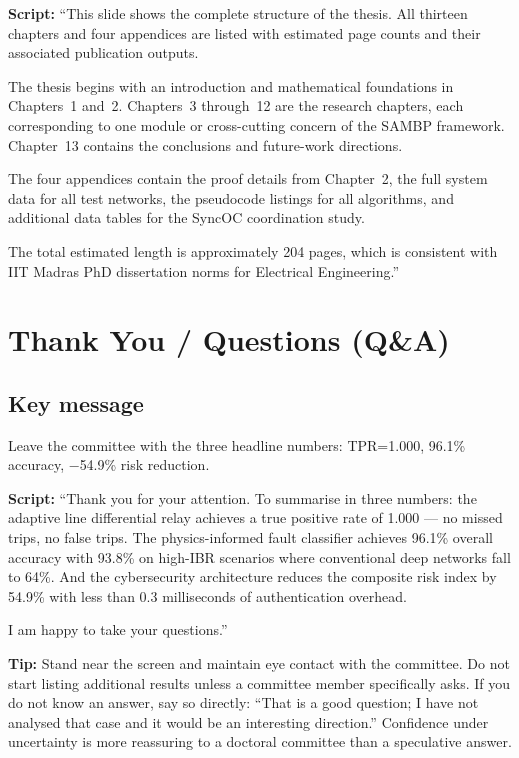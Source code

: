 \documentclass[11pt,a4paper]{article}
\newcommand{\script}[1]{\begin{scriptbox}\textbf{Script:} #1\end{scriptbox}}
\newcommand{\tip}[1]{\begin{tipbox}\textbf{Tip:} #1\end{tipbox}}
\begin{document}
\script{%
``This slide shows the complete structure of the thesis. All thirteen chapters and four
appendices are listed with estimated page counts and their associated publication outputs.

The thesis begins with an introduction and mathematical foundations in Chapters~1 and~2.
Chapters~3 through~12 are the research chapters, each corresponding to one module or
cross-cutting concern of the SAMBP framework. Chapter~13 contains the conclusions and
future-work directions.

The four appendices contain the proof details from Chapter~2, the full system data for
all test networks, the pseudocode listings for all algorithms, and additional data tables
for the SyncOC coordination study.

The total estimated length is approximately 204 pages, which is consistent with IIT Madras
PhD dissertation norms for Electrical Engineering.''%
}

\section{Thank You / Questions \hfill\normalfont\small(Q\&A)}
\label{slide:thanks}

\subsection*{Key message}
Leave the committee with the three headline numbers: TPR=1.000, 96.1\% accuracy,
$-$54.9\% risk reduction.

\script{%
``Thank you for your attention. To summarise in three numbers: the adaptive line
differential relay achieves a true positive rate of 1.000 --- no missed trips, no false
trips. The physics-informed fault classifier achieves 96.1\% overall accuracy with 93.8\%
on high-IBR scenarios where conventional deep networks fall to 64\%. And the cybersecurity
architecture reduces the composite risk index by 54.9\% with less than 0.3 milliseconds
of authentication overhead.

I am happy to take your questions.''%
}

\tip{Stand near the screen and maintain eye contact with the committee. Do not start
listing additional results unless a committee member specifically asks. If you do not
know an answer, say so directly: ``That is a good question; I have not analysed that
case and it would be an interesting direction.'' Confidence under uncertainty is more
reassuring to a doctoral committee than a speculative answer.}
\end{document}
